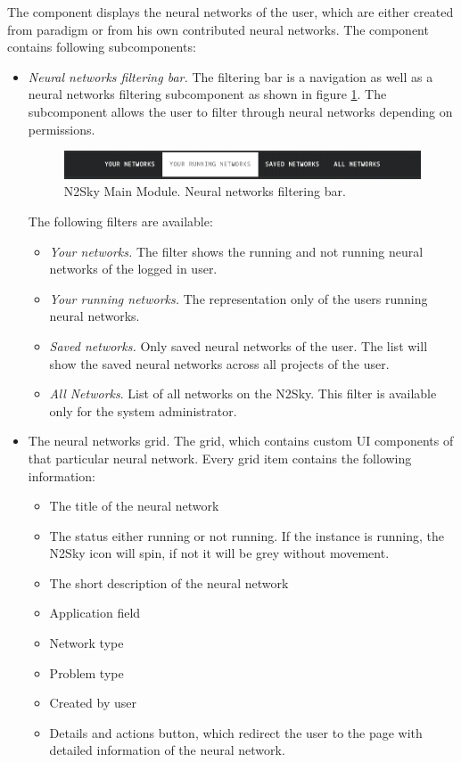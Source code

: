  The component displays the neural networks of the user, which are either created from paradigm or from his own contributed neural networks. The component contains following subcomponents:
 \begin{itemize}
\item \emph{Neural networks filtering bar.}
The filtering bar is a navigation as well as  a neural networks filtering subcomponent as shown in figure \ref{fig:n2sky_filtering_bar}. The subcomponent allows the user to filter through neural networks depending on permissions. 

\begin{figure}[htbp]
\begin{center}
  \includegraphics[scale=0.5]{components/5/img/n2sky_filtering_bar.png}
  \caption{N2Sky Main Module. Neural networks filtering bar.}
  \label{fig:n2sky_filtering_bar}
\end{center}
\end{figure}

The following filters are available: 
\begin{itemize}
\item \emph{Your networks.} The filter shows the running and not running neural networks of the logged in user. 
\item \emph{Your running networks.} The representation only of the users running neural networks.
\item \emph{Saved networks.} Only saved neural networks of the user. The list will show the saved neural networks across all projects of the user.
\item \emph{All Networks}. List of all networks on the N2Sky. This filter is available only for the system administrator.
\end{itemize}
\item{The neural networks grid.} The grid, which contains custom UI components of that particular neural network. Every grid item contains the following information:
\begin{itemize}
\item The title of the neural network
\item The status either running or not running. If the instance is running, the N2Sky icon will spin, if not it will be grey without movement. 
\item The short description of the neural network
\item Application field
\item Network type
\item Problem type
\item Created by user
\item Details and actions button, which redirect the user to the page with detailed information of the neural network. 
\end{itemize}


\end{itemize}
